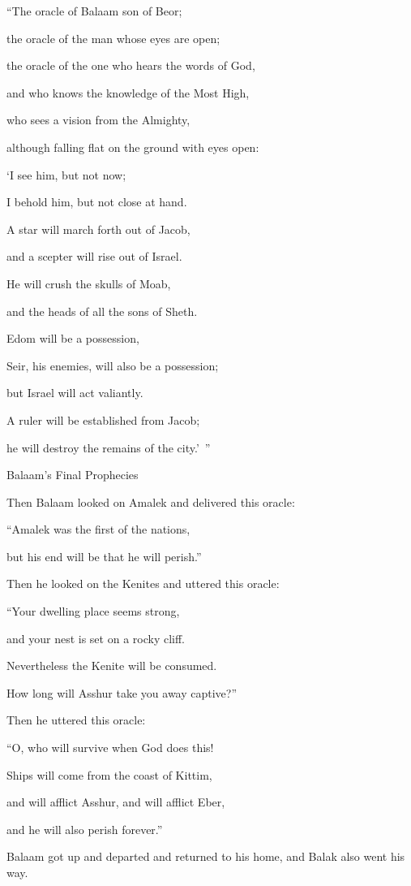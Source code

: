 {\par }{\Q “The oracle
of Balaam
son
of Beor;
\par }{\Q the oracle
of the man
whose eyes are open;
\par }{\Q {}the oracle
of the one who hears
the words
of God,
\par }{\Q and who knows
the knowledge
of the Most
High,
\par }{\Q who sees a vision
from the Almighty,
\par }{\Q although falling
flat
on
the ground with
eyes open:
\par }{\Q {}‘I see
him, but not
now;
\par }{\Q I behold
him, but not
close
at hand.

\par }{\Q A star
will march forth out
of Jacob,
\par }{\Q and a scepter
will rise out
of Israel.
\par }{\Q He will crush
the skulls
of Moab,
\par }{\Q and the heads of all
the sons
of Sheth.
\par }{\Q {}Edom
will be
a possession,
\par }{\Q Seir,
his enemies,
will also be a possession;
\par }{\Q but Israel
will act
valiantly.
\par }{\Q {}A ruler
will be established from Jacob;
\par }{\Q he will destroy
the remains
of the city.’ ”
\par }{\SH Balaam’s Final Prophecies
\par }{\PP {}Then Balaam looked
on Amalek
and delivered
this oracle:

\par }{\Q “Amalek
was the first
of the nations,
\par }{\Q but his end
will be that he will perish.”
\par }{\PP {}Then
he looked
on the Kenites
and uttered
this oracle:
\par }{\Q “Your dwelling place
seems strong,
\par }{\Q and your nest
is set
on a rocky cliff.
\par }{\Q {}Nevertheless
the Kenite
will be
consumed.
\par }{\Q How
long will Asshur
take you away captive?”
\par }{\PP {}Then he uttered
this oracle:
\par }{\Q “O,
who
will survive
when God does this!
\par }{\Q {}Ships
will come from the coast
of Kittim,
\par }{\Q and will afflict
Asshur,
and will afflict
Eber,
\par }{\Q and he
will also
perish
forever.”
\par }{\PP {}Balaam
got
up and departed
and returned
to his home,
and Balak
also
went
his way.


}
